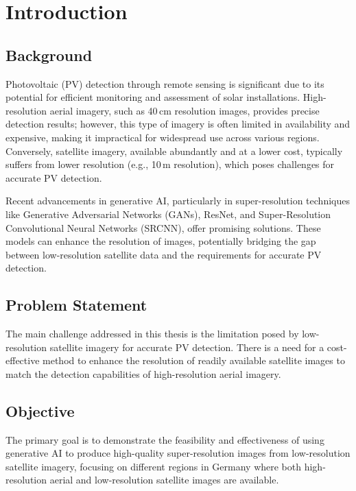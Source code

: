 
\chapter{Introduction}\label{chapter:introduction}

\section{Background}

Photovoltaic (PV) detection through remote sensing is significant due to its potential for efficient monitoring and assessment of solar installations. High-resolution aerial imagery, such as 40\,cm resolution images, provides precise detection results; however, this type of imagery is often limited in availability and expensive, making it impractical for widespread use across various regions. Conversely, satellite imagery, available abundantly and at a lower cost, typically suffers from lower resolution (e.g., 10\,m resolution), which poses challenges for accurate PV detection.

Recent advancements in generative AI, particularly in super-resolution techniques like Generative Adversarial Networks (GANs), ResNet, and Super-Resolution Convolutional Neural Networks (SRCNN), offer promising solutions. These models can enhance the resolution of images, potentially bridging the gap between low-resolution satellite data and the requirements for accurate PV detection.

\section{Problem Statement}

The main challenge addressed in this thesis is the limitation posed by low-resolution satellite imagery for accurate PV detection. There is a need for a cost-effective method to enhance the resolution of readily available satellite images to match the detection capabilities of high-resolution aerial imagery.

\section{Objective}

The primary goal is to demonstrate the feasibility and effectiveness of using generative AI to produce high-quality super-resolution images from low-resolution satellite imagery, focusing on different regions in Germany where both high-resolution aerial and low-resolution satellite images are available.

